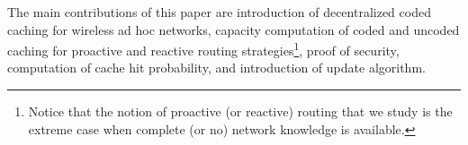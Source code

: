 \documentclass[10pt,journal]{IEEEtran}
\begin{document}
The main contributions of this paper are introduction of decentralized coded caching for wireless ad hoc networks, capacity computation of coded and uncoded caching for proactive and reactive routing strategies\footnote{Notice that the notion of proactive (or reactive) routing that we study is the extreme case when complete (or no) network knowledge is available.}, proof of security,  computation of cache hit probability, and introduction of update algorithm. 
\end{document}
